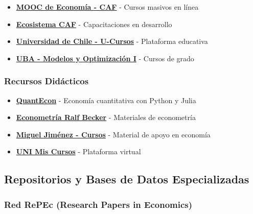 \documentclass[
  jou,
  floatsintext,
  longtable,
  a4paper,
  nolmodern,
  notxfonts,
  notimes,
  12pt,
  colorlinks=true,linkcolor=blue,citecolor=blue,urlcolor=blue]{apa7}
\providecommand{\tightlist}{%
  \setlength{\itemsep}{0pt}\setlength{\parskip}{0pt}}
\begin{document}
\begin{itemize}
\tightlist
\item
  \textbf{\href{https://www.caf.com/es/actualidad/capacitacion/2023/08/mooc-de-economia/}{MOOC
  de Economía - CAF}} - Cursos masivos en línea
\item
  \textbf{\href{https://capacitaciones.caf.com/}{Ecosistema CAF}} -
  Capacitaciones en desarrollo
\item
  \textbf{\href{https://uchile.cl/presentacion/vicerrectoria-de-asuntos-economicos-y-gestion-institucional/convenio-de-desempeno/sistemas-de-gestion/u-cursos}{Universidad
  de Chile - U-Cursos}} - Plataforma educativa
\item
  \textbf{\href{https://campusgrado.fi.uba.ar/course/view.php?id=303}{UBA
  - Modelos y Optimización I}} - Cursos de grado
\end{itemize}

\subsubsection{Recursos Didácticos}\label{recursos-diduxe1cticos}

\begin{itemize}
\tightlist
\item
  \textbf{\href{https://quantecon.org/}{QuantEcon}} - Economía
  cuantitativa con Python y Julia
\item
  \textbf{\href{https://datasquad.github.io/ralffbecker/index.html}{Econometría
  Ralf Becker}} - Materiales de econometría
\item
  \textbf{\href{https://migueljimenezg.github.io/cursos/index.html}{Miguel
  Jiménez - Cursos}} - Material de apoyo en economía
\item
  \textbf{\href{https://pit-virtual.uni.edu.pe/my/courses.php}{UNI Mis
  Cursos}} - Plataforma virtual
\end{itemize}

\subsection{Repositorios y Bases de Datos
Especializadas}\label{repositorios-y-bases-de-datos-especializadas}

\subsubsection{Red RePEc (Research Papers in
Economics)}\label{red-repec-research-papers-in-economics}
\end{document}
